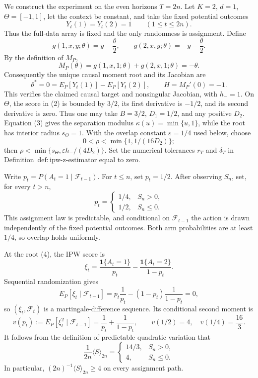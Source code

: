 We construct the experiment on the even horizons \(T=2n\).  Let \(K=2\), \(d=1\), \(\Theta=[-1,1]\), let the context be constant, and take the fixed potential outcomes
\[
Y_t(1)=Y_t(2)=1\qquad(1\le t\le 2n).
\tag{1}
\]
Thus the full-data array is fixed and the only randomness is assignment.  Define
\[
g(1,x,y;\theta)=y-\frac{\theta}{2},
\qquad
g(2,x,y;\theta)=-y-\frac{\theta}{2}.
\tag{2}
\]
By the definition of \(M_P\),
\[
M_P(\theta)=g(1,x,1;\theta)+g(2,x,1;\theta)=-\theta.
\tag{3}
\]
Consequently the unique causal moment root and its Jacobian are
\[
\theta^*=0=E_P[Y_t(1)]-E_P[Y_t(2)],
\qquad H=M_P'(0)=-1.
\tag{4}
\]
This verifies the claimed causal target and nonsingular Jacobian, with \(h_-=1\).  On \(\Theta\), the score in (2) is bounded by \(3/2\), its first derivative is \(-1/2\), and its second derivative is zero.  Thus one may take \(B=3/2\), \(D_1=1/2\), and any positive \(D_2\).  Equation (3) gives the separation modulus \(\kappa(u)=\min\{u,1\}\), while the root has interior radius \(s_\Theta=1\).  With the overlap constant \(\varepsilon=1/4\) used below, choose
\[
0<\rho<\min\{1,1/(16D_2)\};
\tag{5}
\]
then \(\rho<\min\{s_\Theta,\varepsilon h_-/(4D_2)\}\).  Set the numerical tolerances \(r_T\) and \(\delta_T\) in Definition~\(\mathrm{def:ipw\text{-}z\text{-}estimator}\) equal to zero.

Write \(p_t=P(A_t=1\mid\mathcal F_{t-1})\).  For \(t\le n\), set \(p_t=1/2\).  After observing \(S_n\), set, for every \(t>n\),
\[
p_t=
\begin{cases}
1/4,&S_n>0,\\
1/2,&S_n\le0.
\end{cases}
\tag{6}
\]
This assignment law is predictable, and conditional on \(\mathcal F_{t-1}\) the action is drawn independently of the fixed potential outcomes.  Both arm probabilities are at least \(1/4\), so overlap holds uniformly.

At the root (4), the IPW score is
\[
\xi_t=
\frac{\mathbf1\{A_t=1\}}{p_t}
-\frac{\mathbf1\{A_t=2\}}{1-p_t}.
\tag{7}
\]
Sequential randomization gives
\[
E_P[\xi_t\mid\mathcal F_{t-1}]
=p_t\frac1{p_t}-(1-p_t)\frac1{1-p_t}=0,
\tag{8}
\]
so \((\xi_t,\mathcal F_t)\) is a martingale-difference sequence.  Its conditional second moment is
\[
v(p_t):=E_P[\xi_t^2\mid\mathcal F_{t-1}]
=\frac1{p_t}+\frac1{1-p_t},
\qquad
v(1/2)=4,
\quad v(1/4)=\frac{16}{3}.
\tag{9}
\]
It follows from the definition of predictable quadratic variation that
\[
\frac1{2n}\langle S\rangle_{2n}
=
\begin{cases}
14/3,&S_n>0,\\
4,&S_n\le0.
\end{cases}
\tag{10}
\]
In particular, \((2n)^{-1}\langle S\rangle_{2n}\ge4\) on every assignment path.


